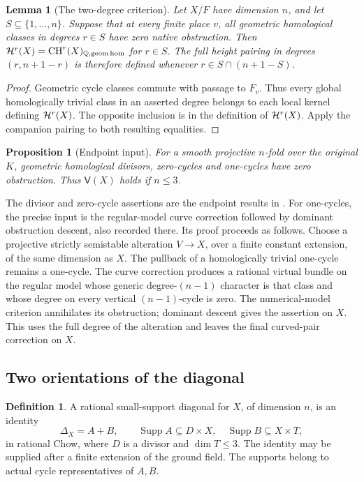 \documentclass[11pt,a4paper]{article}
\newtheorem{proposition}[theorem]{Proposition}
\newtheorem{lemma}[theorem]{Lemma}
\theoremstyle{definition}
\newtheorem{definition}[theorem]{Definition}
\theoremstyle{remark}\newtheorem{remark}[theorem]{Remark}
\numberwithin{equation}{section}
\newcommand{\Q}{\mathbb Q}\newcommand{\R}{\mathbb R}\newcommand{\C}{\mathbb C}
\newcommand{\CH}{\operatorname{CH}}\newcommand{\an}{\mathrm{an}}
\begin{document}
\begin{lemma}[The two-degree criterion]\label{lem:two-degrees}
Let $X/F$ have dimension $n$, and let $S\subseteq\{1,\ldots,n\}$.
Suppose that at every finite place $v$, all geometric homological
classes in degrees $r\in S$ have zero native obstruction. Then
$\cH^r(X)=\CH^r(X)_{\Q,\geomhom}$ for $r\in S$. The full height
pairing in degrees $(r,n+1-r)$ is therefore defined whenever
$r\in S\cap(n+1-S)$.
\end{lemma}

\begin{proof}
Geometric cycle classes commute with passage to $F_v$. Thus every
global homologically trivial class in an asserted degree belongs to
each local kernel defining $\mathcal H^r(X)$. The opposite inclusion is in
the definition of $\mathcal H^r(X)$. Apply the companion pairing to both
resulting equalities.
\end{proof}

\begin{proposition}[Endpoint input]\label{prop:endpoint-input}
For a smooth projective $n$-fold over the original $K$, geometric
homological divisors, zero-cycles and one-cycles have zero obstruction.
Thus $\mathsf V(X)$ holds if $n\leq3$.
\end{proposition}

The divisor and zero-cycle assertions are the endpoint results in
\cite{InternalEndpoints}. For one-cycles, the precise input is the
regular-model curve correction followed by dominant obstruction
descent, also recorded there. Its proof proceeds as follows. Choose a
projective strictly semistable alteration $V\to X$, over a finite
constant extension, of the same dimension as $X$. The pullback of a
homologically trivial one-cycle remains a one-cycle. The curve
correction produces a rational virtual bundle on the regular model
whose generic degree-$(n-1)$ character is that class and whose degree
on every vertical $(n-1)$-cycle is zero. The numerical-model criterion
annihilates its obstruction; dominant descent gives the assertion on
$X$. This uses the full degree of the alteration and leaves the final
curved-pair correction on $X$.

\subsection{Two orientations of the diagonal}\label{sub:small-support}

\begin{definition}\label{def:small-support}
A rational small-support diagonal for $X$, of dimension $n$, is an
identity
\begin{equation}\label{eq:small-diagonal}
 \Delta_X=A+B,\qquad
 \operatorname{Supp}A\subseteq D\times X,\quad
 \operatorname{Supp}B\subseteq X\times T,
\end{equation}
in rational Chow, where $D$ is a divisor and $\dim T\leq3$.
The identity may be supplied after a finite extension of the ground
field. The supports belong to actual cycle representatives of $A,B$.
\end{definition}
\end{document}
